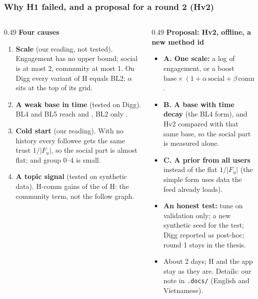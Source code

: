 \documentclass[aspectratio=169,11pt]{beamer}
\begin{document}
\begin{frame}
  \frametitle{Why H1 failed, and a proposal for a round 2 (Hv2)}
  \begin{columns}[T]
    \begin{column}{0.49\textwidth}
      \textbf{Four causes}
      \begin{enumerate}\footnotesize
        \setlength\itemsep{1pt}
        \item \textbf{Scale} (our reading, not tested). Engagement has no upper bound; social is at most 2, community at most 1. On Digg every variant of H equals BL2; $\alpha$ sits at the top of its grid.
        \item \textbf{A weak base in time} (tested on Digg). BL4 and BL5 reach \eOneDiggNdcgBLFourTenAllValue{} and \eOneDiggNdcgBLFiveTenAllValue{}, BL2 only \eOneDiggNdcgBLTwoTenAllValue{}.
        \item \textbf{Cold start} (our reading). With no history every followee gets the same trust $1/|F_u|$, so the social part is almost flat; and group 0--4 is small.
        \item \textbf{A topic signal} (tested on synthetic data). H-comm gains \eFourWTwoMNdcgHCommTenAllGain{} of the \eFourWTwoMNdcgHTenAllGain{} of H: the community term, not the follow graph.
      \end{enumerate}
    \end{column}
    \begin{column}{0.49\textwidth}
      \textbf{Proposal: Hv2, offline, a new method id}
      \begin{itemize}\footnotesize
        \setlength\itemsep{1pt}
        \item \textbf{A. One scale:} a log of engagement, or a boost $\text{base}\times(1+\alpha\,\text{social}+\beta\,\text{community})$.
        \item \textbf{B. A base with time decay} (the BL4 form), and Hv2 compared with that same base, so the social part is measured alone.
        \item \textbf{C. A prior from all users} instead of the flat $1/|F_u|$ (the simple form uses data the feed already loads).
        \item \textbf{An honest test:} tune on validation only; a new synthetic seed for the test; Digg reported as post-hoc; round 1 stays in the thesis.
        \item About 2 days; H and the app stay as they are. Details: our note in \texttt{.docs/} (English and Vietnamese).
      \end{itemize}
    \end{column}
  \end{columns}
\end{frame}
\end{document}
